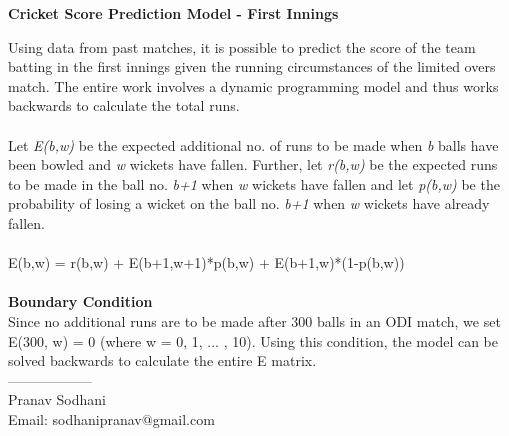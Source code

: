 \documentclass{article}
\begin{document}
\begin{center} 
\Large{\textbf{Cricket Score Prediction Model - First Innings}}
\end{center}
\vspace{5mm}
Using data from past matches, it is possible to predict the score of the team batting in the first innings given the running circumstances of the limited overs match. The entire work involves a dynamic programming model and thus works backwards to calculate the total runs.
\\
\\
 Let \textit{E(b,w)} be the expected additional no. of runs to be made when \textit{b} balls have been bowled and \textit{w} wickets have fallen. Further, let \textit{r(b,w)} be the expected runs to be made in the ball no. \textit{b+1} when \textit{w} wickets have fallen and let \textit{p(b,w)} be the probability of losing a wicket on the ball no. \textit{b+1} when \textit{w} wickets have already fallen.
\\
\\
E(b,w) = r(b,w) + E(b+1,w+1)*p(b,w) + E(b+1,w)*(1-p(b,w))
\\
\\
\textbf{Boundary Condition}
\\
Since no additional runs are to be made after 300 balls in an ODI match, we set E(300, w) = 0 (where w = 0, 1, ... , 10). Using this condition, the model can be solved backwards to calculate the entire E matrix.
\vspace{5mm}
\\
------------------\\
Pranav Sodhani \\
Email: sodhanipranav@gmail.com 
\end{document}
